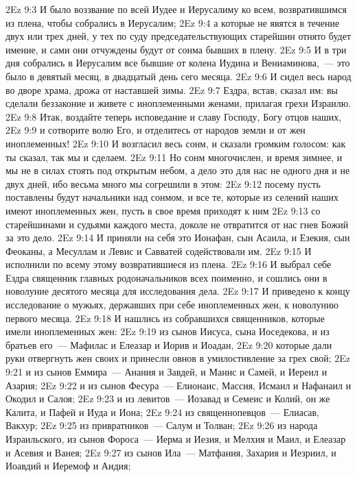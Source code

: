 \vs 2Ez 9:3 И было воззвание по всей Иудее и Иерусалиму ко всем, возвратившимся из плена, чтобы собрались в Иерусалим;
\vs 2Ez 9:4 а которые не явятся в течение двух или трех дней, у тех по суду председательствующих старейшин отнято будет имение, и сами они отчуждены будут от сонма бывших в плену.
\rsbpar\vs 2Ez 9:5 И в три дня собрались в Иерусалим все бывшие от колена Иудина и Вениаминова,~--- это было в девятый месяц, в двадцатый день сего месяца.
\vs 2Ez 9:6 И сидел весь народ во дворе храма, дрожа от наставшей зимы.
\vs 2Ez 9:7 Ездра, встав, сказал им: вы сделали беззаконие и живете с иноплеменными женами, прилагая грехи Израилю.
\vs 2Ez 9:8 Итак, воздайте теперь исповедание и славу Господу, Богу отцов наших,
\vs 2Ez 9:9 и сотворите волю Его, и отделитесь от народов земли и от жен иноплеменных!
\vs 2Ez 9:10 И возгласил весь сонм, и сказали громким голосом: как ты сказал, так мы и сделаем.
\vs 2Ez 9:11 Но сонм многочислен, и время зимнее, и мы не в силах стоять под открытым небом, а дело это для нас не одного дня и не двух дней, ибо весьма много мы согрешили в этом:
\vs 2Ez 9:12 посему пусть поставлены будут начальники над сонмом, и все те, которые из селений наших имеют иноплеменных жен, пусть в свое время приходят к ним
\vs 2Ez 9:13 со старейшинами и судьями каждого места, доколе не отвратится от нас гнев Божий за это дело.
\rsbpar\vs 2Ez 9:14 И приняли на себя это Ионафан, сын Асаила, и Езекия, сын Феоканы, а Месуллам и Левис и Савватей содействовали им.
\vs 2Ez 9:15 И исполнили по всему этому возвратившиеся из плена.
\vs 2Ez 9:16 И выбрал себе Ездра священник главных родоначальников всех поименно, и сошлись они в новолуние десятого месяца для исследования дела.
\vs 2Ez 9:17 И приведено к концу исследование о мужьях, державших при себе иноплеменных жен, к новолунию первого месяца.
\vs 2Ez 9:18 И нашлись из собравшихся священников, которые имели иноплеменных жен:
\vs 2Ez 9:19 из сынов Иисуса, сына Иоседекова, и из братьев его~--- Мафилас и Елеазар и Иорив и Иоадан,
\vs 2Ez 9:20 которые дали руки отвергнуть жен своих и принесли овнов в умилостивление за грех свой;
\vs 2Ez 9:21 и из сынов Еммира~--- Анания и Завдей, и Манис и Самей, и Иереил и Азария;
\vs 2Ez 9:22 и из сынов Фесура~--- Елионаис, Массия, Исмаил и Нафанаил и Окодил и Салоя;
\vs 2Ez 9:23 и из левитов~--- Иозавад и Семеис и Колий, он же Калита, и Пафей и Иуда и Иона;
\vs 2Ez 9:24 из священнопевцов~--- Елиасав, Вакхур;
\vs 2Ez 9:25 из привратников~--- Салум и Толван;
\vs 2Ez 9:26 из народа Израильского, из сынов Фороса~--- Иерма и Иезия, и Мелхия и Маил, и Елеазар и Асевия и Ванея;
\vs 2Ez 9:27 из сынов Ила~--- Матфания, Захария и Иезриил, и Иоавдий и Иеремоф и Аидия;
